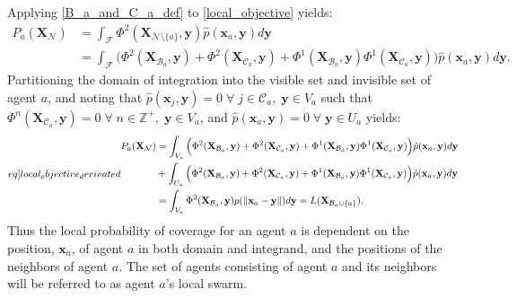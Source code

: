 Applying \eqref{B_a_and_C_a_def} to \eqref{local_objective} yields:
\begin{equation}
  \begin{split}
    P_{a}(\mathbf{X}_{\mathcal{N}}) &= \int_{\mathcal{F}}\Phi^{2}(\mathbf{X}_{\mathcal{N}\setminus\{a\}}, \mathbf{y})\hat{p}(\mathbf{x}_{a}, \mathbf{y})d\mathbf{y}\\
    &= \int_{\mathcal{F}}\Big(\Phi^{2}(\mathbf{X}_{\mathcal{B}_{a}}, \mathbf{y}) + \Phi^{2}(\mathbf{X}_{\mathcal{C}_{a}}, \mathbf{y}) + \Phi^{1}(\mathbf{X}_{\mathcal{B}_{a}}, \mathbf{y})\Phi^{1}(\mathbf{X}_{\mathcal{C}_{a}}, \mathbf{y})\Big)\hat{p}(\mathbf{x}_{a}, \mathbf{y})d\mathbf{y}.
  \end{split}
\end{equation}
Partitioning the domain of integration into the visible set and invisible set of agent $a$, and noting that $\hat{p}(\mathbf{x}_{j}, \mathbf{y}) = 0\;\forall\;j\in\mathcal{C}_{a},\;\mathbf{y}\in V_{a}$ such that
$\Phi^{n}(\mathbf{X}_{\mathcal{C}_{a}}, \mathbf{y}) = 0\;\forall\;n\in\mathbb{Z}^{+},\;\mathbf{y}\in V_{a}$, and $\hat{p}(\mathbf{x}_{a}, \mathbf{y}) = 0\;\forall\;\mathbf{y}\in U_{a}$ yields:
\begin{equation}\label[eq]{local_objective_derivated}
  \begin{split}
    P_{a}(\mathbf{X}_{\mathcal{N}}) &= \int_{V_{a}}\Big(\Phi^{2}(\mathbf{X}_{\mathcal{B}_{a}}, \mathbf{y}) + \Phi^{2}(\mathbf{X}_{\mathcal{C}_{a}}, \mathbf{y}) + \Phi^{1}(\mathbf{X}_{\mathcal{B}_{a}}, \mathbf{y})\Phi^{1}(\mathbf{X}_{\mathcal{C}_{a}}, \mathbf{y})\Big)\hat{p}(\mathbf{x}_{a}, \mathbf{y})d\mathbf{y}\\
    &+ \int_{U_{a}}\Big(\Phi^{2}(\mathbf{X}_{\mathcal{B}_{a}}, \mathbf{y}) + \Phi^{2}(\mathbf{X}_{\mathcal{C}_{a}}, \mathbf{y}) + \Phi^{1}(\mathbf{X}_{\mathcal{B}_{a}}, \mathbf{y})\Phi^{1}(\mathbf{X}_{\mathcal{C}_{a}}, \mathbf{y})\Big)\hat{p}(\mathbf{x}_{a}, \mathbf{y})d\mathbf{y}\\
    &= \int_{V_{a}}\Phi^{2}(\mathbf{X}_{\mathcal{B}_{a}}, \mathbf{y})p(\norm{\mathbf{x}_{a}-\mathbf{y}})d\mathbf{y} = L(\mathbf{X}_{\mathcal{B}_{a}\cup\{a\}}).
  \end{split}
\end{equation}
Thus the local probability of coverage for an agent $a$ is dependent on the position, $\mathbf{x}_{a}$, of agent $a$ in both domain and integrand, and the positions of the neighbors of agent $a$.
The set of agents consisting of agent $a$ and its neighbors will be referred to as agent $a$'s local swarm.\clearpage

